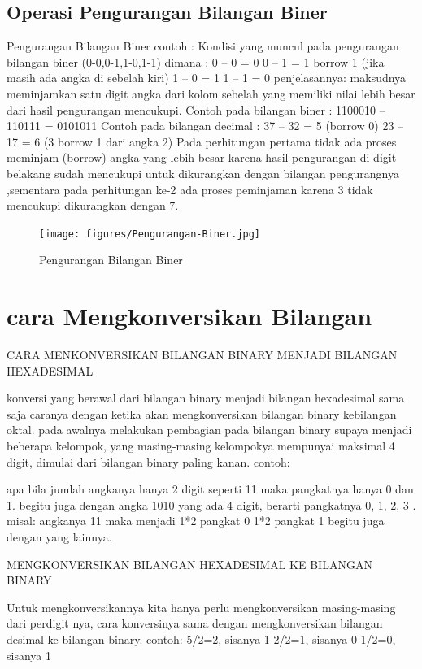 \subsection {Operasi Pengurangan Bilangan Biner}	
	Pengurangan Bilangan Biner
	contoh :
Kondisi yang muncul pada pengurangan bilangan biner (0-0,0-1,1-0,1-1) dimana :
0 – 0 = 0
0 – 1 = 1 borrow 1 (jika masih ada angka di sebelah kiri)
1 – 0 = 1
1 – 1 = 0
penjelasannya: maksudnya meminjamkan satu digit angka dari kolom sebelah yang memiliki nilai lebih besar dari hasil pengurangan mencukupi.
Contoh pada bilangan biner :
1100010 – 110111 = 0101011 
Contoh pada bilangan decimal :
37 – 32 = 5 (borrow 0)
23 – 17 = 6 (3 borrow 1 dari angka 2)
Pada perhitungan pertama tidak ada proses meminjam (borrow) angka yang lebih besar karena hasil pengurangan di digit belakang sudah mencukupi untuk dikurangkan dengan bilangan pengurangnya ,sementara pada perhitungan ke-2 ada proses peminjaman karena 3 tidak mencukupi dikurangkan dengan 7.

\begin{figure}[ht]
\centerline{\texttt{[image: figures/Pengurangan-Biner.jpg]}}
\caption{Pengurangan Bilangan Biner}
\label{BilanganBiner}
\end {figure}

\section {cara Mengkonversikan Bilangan}
 CARA MENKONVERSIKAN BILANGAN BINARY MENJADI BILANGAN HEXADESIMAL
 
 konversi yang berawal dari bilangan binary menjadi bilangan hexadesimal sama saja caranya dengan ketika akan mengkonversikan bilangan binary kebilangan oktal. pada awalnya melakukan pembagian pada bilangan binary supaya menjadi beberapa kelompok, yang masing-masing kelompokya mempunyai maksimal 4 digit, dimulai dari bilangan binary paling kanan.
contoh:
 
apa bila jumlah angkanya hanya 2 digit seperti 11 maka pangkatnya hanya 0 dan 1. begitu juga dengan angka 1010 yang ada 4 digit, berarti pangkatnya 0, 1, 2, 3 . 
misal: angkanya 11 maka menjadi
		1*2 pangkat 0
		1*2 pangkat 1
		begitu juga dengan yang lainnya.


MENGKONVERSIKAN BILANGAN HEXADESIMAL KE BILANGAN BINARY

Untuk mengkonversikannya kita hanya perlu mengkonversikan masing-masing dari perdigit nya, cara konversinya sama dengan mengkonversikan bilangan desimal ke bilangan binary.
contoh: 
	5/2=2, sisanya 1
	2/2=1, sisanya 0
	1/2=0, sisanya 1
	
